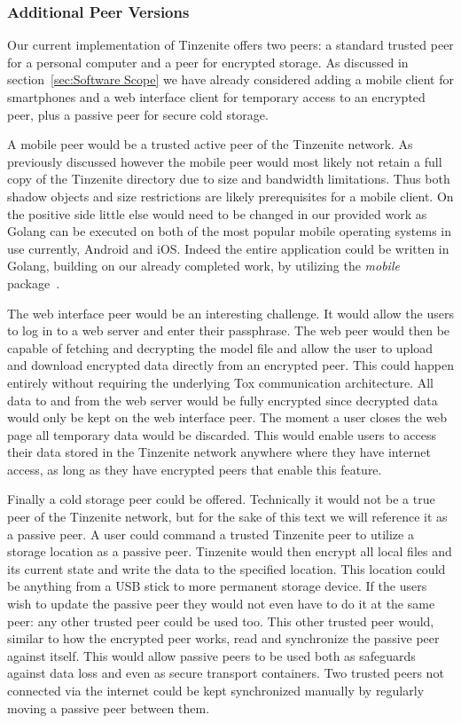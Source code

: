 \subsubsection{Additional Peer Versions}
\label{subs:Additional Peer Versions}

Our current implementation of Tinzenite offers two peers: a standard trusted peer for a personal computer and a peer for encrypted storage.
As discussed in section~\ref{sec:Software Scope} we have already considered adding a mobile client for smartphones and a web interface client for temporary access to an encrypted peer, plus a passive peer for secure cold storage.

A mobile peer would be a trusted active peer of the Tinzenite network.
As previously discussed however the mobile peer would most likely not retain a full copy of the Tinzenite directory due to size and bandwidth limitations.
Thus both shadow objects and size restrictions are likely prerequisites for a mobile client.
On the positive side little else would need to be changed in our provided work as Golang can be executed on both of the most popular mobile operating systems in use currently, Android and iOS.
Indeed the entire application could be written in Golang, building on our already completed work, by utilizing the \emph{mobile} package~\cite{web:site:golang:mobile}.

The web interface peer would be an interesting challenge.
It would allow the users to log in to a web server and enter their passphrase.
The web peer would then be capable of fetching and decrypting the model file and allow the user to upload and download encrypted data directly from an encrypted peer.
This could happen entirely without requiring the underlying Tox communication architecture.
All data to and from the web server would be fully encrypted since decrypted data would only be kept on the web interface peer.
The moment a user closes the web page all temporary data would be discarded.
This would enable users to access their data stored in the Tinzenite network anywhere where they have internet access, as long as they have encrypted peers that enable this feature.

Finally a cold storage peer could be offered.
Technically it would not be a true peer of the Tinzenite network, but for the sake of this text we will reference it as a passive peer.
A user could command a trusted Tinzenite peer to utilize a storage location as a passive peer.
Tinzenite would then encrypt all local files and its current state and write the data to the specified location.
This location could be anything from a USB stick to more permanent storage device.
If the users wish to update the passive peer they would not even have to do it at the same peer: any other trusted peer could be used too.
This other trusted peer would, similar to how the encrypted peer works, read and synchronize the passive peer against itself.
This would allow passive peers to be used both as safeguards against data loss and even as secure transport containers.
Two trusted peers not connected via the internet could be kept synchronized manually by regularly moving a passive peer between them.


